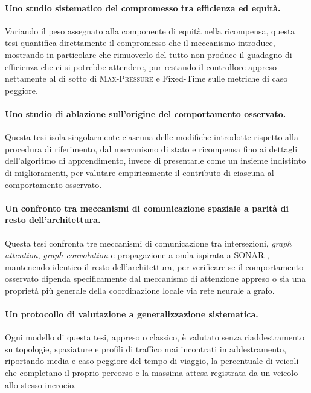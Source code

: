 \paragraph{Uno studio sistematico del compromesso tra efficienza ed
    equità.} Variando il peso assegnato alla componente di equità nella
ricompensa, questa tesi quantifica direttamente il compromesso che il
meccanismo introduce, mostrando in particolare che rimuoverlo del tutto
non produce il guadagno di efficienza che ci si potrebbe attendere, pur
restando il controllore appreso nettamente al di sotto di
\textsc{Max-Pressure} e Fixed-Time sulle metriche di caso peggiore.

\paragraph{Uno studio di ablazione sull'origine del comportamento
    osservato.} Questa tesi isola singolarmente ciascuna delle modifiche
introdotte rispetto alla procedura di riferimento, dal meccanismo di
stato e ricompensa fino ai dettagli dell'algoritmo di apprendimento,
invece di presentarle come un insieme indistinto di miglioramenti, per
valutare empiricamente il contributo di ciascuna al comportamento
osservato.

\paragraph{Un confronto tra meccanismi di comunicazione spaziale a parità
    di resto dell'architettura.} Questa tesi confronta tre meccanismi di
comunicazione tra intersezioni, \emph{graph attention}, \emph{graph convolution} e propagazione a onda ispirata a SONAR \citep{trenta2025sonar}, mantenendo identico il
resto dell'architettura, per verificare se il comportamento osservato
dipenda specificamente dal meccanismo di attenzione appreso o sia una
proprietà più generale della coordinazione locale via rete neurale a
grafo.

\paragraph{Un protocollo di valutazione a generalizzazione sistematica.}
Ogni modello di questa tesi, appreso o classico, è valutato senza
riaddestramento su topologie, spaziature e profili di traffico mai
incontrati in addestramento, riportando media e caso peggiore del tempo
di viaggio, la percentuale di veicoli che completano il proprio percorso
e la massima attesa registrata da un veicolo allo stesso incrocio.

